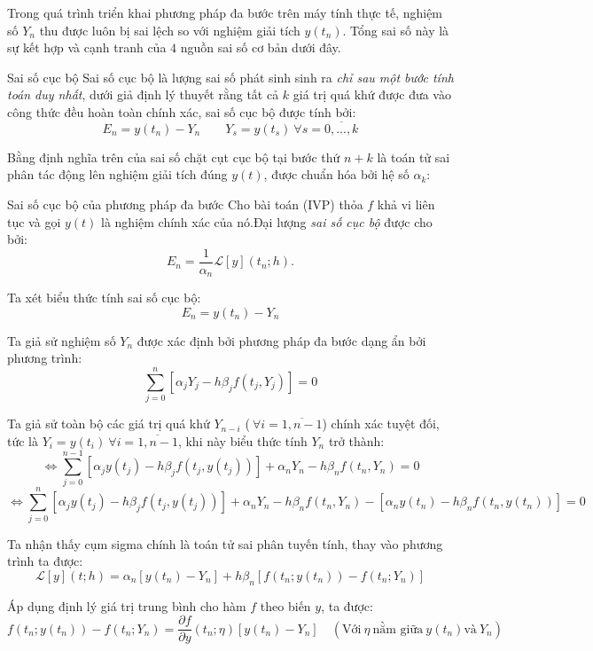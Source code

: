 Trong quá trình triển khai phương pháp đa bước trên máy tính thực tế, nghiệm số $Y_n$ thu được luôn bị sai lệch so với nghiệm giải tích $y(t_n)$. Tổng sai số này là sự kết hợp và cạnh tranh của $4$ nguồn sai số cơ bản dưới đây.
\begin{baitapbox}{Sai số cục bộ}
    Sai số cục bộ là lượng sai số phát sinh sinh ra \textit{chỉ sau một bước tính toán duy nhất}, dưới giả định lý thuyết rằng tất cả $k$ giá trị quá khứ được đưa vào công thức đều hoàn toàn chính xác, sai số cục bộ được tính bởi:
    \[  
        E_n= y(t_n) - Y_n \qquad Y_s = y(t_s) \  \forall s =\overline{0,...,k}
    \]
\end{baitapbox}
Bằng định nghĩa trên của sai số chặt cụt cục bộ tại bước thứ $n+k$ là toán tử sai phân tác động lên nghiệm giải tích đúng $y(t)$, được chuẩn hóa bởi hệ số $\alpha_k$:
\begin{baitapbox}{Sai số cục bộ của phương pháp đa bước}
    Cho bài toán (IVP) thỏa $f$ khả vi liên tục và gọi $y(t)$ là nghiệm chính xác của nó.Đại lượng \textit{sai số cục bộ} được cho bởi:
    \begin{equation}
        E_{n} = \frac{1}{\alpha_n} \mathcal{L}[y](t_n; h). \tag{2.8} \label{eq:2.8}
    \end{equation}   
\end{baitapbox}

Ta xét biểu thức tính sai số cục bộ:
\[
E_n = y(t_n) - Y_n
\]

Ta giả sử nghiệm số $Y_n$ được xác định bởi phương pháp đa bước dạng ẩn bởi phương trình:
\[
\sum_{j=0}^{n} \left[ \alpha_j Y_{j}  -h  \beta_j f(t_{j}, Y_{j})\right] = 0
\]

Ta giả sử toàn bộ các giá trị quá khứ $Y_{n-i}$ ($\ \forall i = \overline{1,n-1}$) chính xác tuyệt đối, tức là $Y_i = y(t_i) \ \forall i  = \overline{1,n-1}$, khi này biểu thức tính $Y_n$ trở thành:
\[
\Leftrightarrow \sum_{j=0}^{n-1} \left[ \alpha_j y(t_j)  -h  \beta_j f(t_{j}, y(t_j))\right] + \alpha_n Y_{n}  -h  \beta_n f(t_{n}, Y_{n})  = 0
\]
\[
\Leftrightarrow  \sum_{j=0}^{n} \left[ \alpha_j y(t_j)  -h  \beta_j f(t_{j}, y(t_j))\right] + \alpha_n Y_{n}  -h  \beta_n f(t_{n}, Y_{n}) -\left[ \alpha_n y(t_n)  -h  \beta_n f(t_{n}, y(t_n)) \right] = 0
\]

Ta nhận thấy cụm sigma chính là toán tử sai phân tuyến tính, thay vào phương trình ta được:
\[
\mathcal{L}[y](t; h) = \alpha_n \left[ y(t_n) - Y_n\right] + h\beta_n\left[f(t_n;y(t_n)) -f(t_n;Y_n) \right]
\]

Áp dụng định lý giá trị trung bình cho hàm $f$ theo biến $y$, ta được:
\[
f(t_n;y(t_n)) -f(t_n;Y_n) = \frac{\partial f}{\partial y}(t_n;\eta)\left[y(t_n) - Y_n\right] \quad (\text{Với} \ \eta \ \text{nằm giữa} \  y(t_n) \text{và} \ Y_n)
\]

